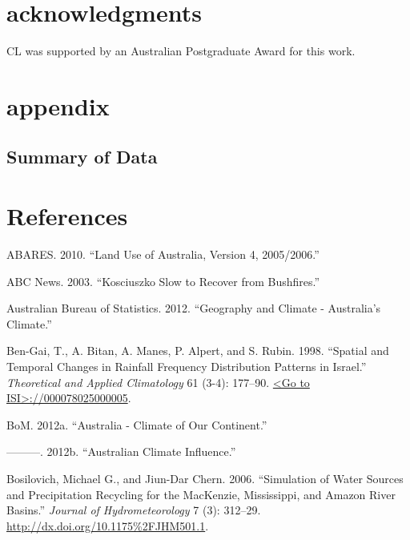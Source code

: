 \documentclass[fleqn,10pt,lineno]{wlpeerj} %
\begin{document}
\section{acknowledgments}\label{acknowledgments}

CL was supported by an Australian Postgraduate Award for this work.

\newpage

\section{appendix}\label{appendix}

\subsection{Summary of Data}\label{summary-of-data}

\newpage

\section*{References}\label{references}

\hypertarget{refs}{}
\hypertarget{ref-ABARES2010}{}
ABARES. 2010. ``Land Use of Australia, Version 4, 2005/2006.''

\hypertarget{ref-ABC2003}{}
ABC News. 2003. ``Kosciuszko Slow to Recover from Bushfires.''

\hypertarget{ref-ABS2012}{}
Australian Bureau of Statistics. 2012. ``Geography and Climate -
Australia's Climate.''

\hypertarget{ref-Ben-Gai1998}{}
Ben-Gai, T., A. Bitan, A. Manes, P. Alpert, and S. Rubin. 1998.
``Spatial and Temporal Changes in Rainfall Frequency Distribution
Patterns in Israel.'' \emph{Theoretical and Applied Climatology} 61
(3-4): 177--90.
\href{\%3CGo\%20to\%20ISI\%3E://000078025000005}{\textless{}Go to ISI\textgreater{}://000078025000005}.

\hypertarget{ref-BoM2012a}{}
BoM. 2012a. ``Australia - Climate of Our Continent.''

\hypertarget{ref-BoM2012}{}
---------. 2012b. ``Australian Climate Influence.''

\hypertarget{ref-Bosilovich2006}{}
Bosilovich, Michael G., and Jiun-Dar Chern. 2006. ``Simulation of Water
Sources and Precipitation Recycling for the MacKenzie, Mississippi, and
Amazon River Basins.'' \emph{Journal of Hydrometeorology} 7 (3):
312--29. \url{http://dx.doi.org/10.1175\%2FJHM501.1}.
\end{document}
